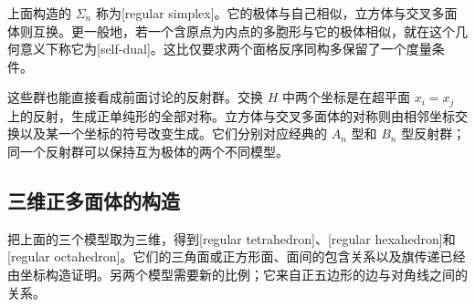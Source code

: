 上面构造的 \(\Sigma_n\) 称为[regular simplex]。它的极体与自己相似，立方体与交叉多面体则互换。更一般地，若一个含原点为内点的多胞形与它的极体相似，就在这个几何意义下称它为[self-dual]。这比仅要求两个面格反序同构多保留了一个度量条件。

\ProseParagraphBreak

这些群也能直接看成前面讨论的反射群。交换 \(H\) 中两个坐标是在超平面 \(x_i=x_j\) 上的反射，生成正单纯形的全部对称。立方体与交叉多面体的对称则由相邻坐标交换以及某一个坐标的符号改变生成。它们分别对应经典的 \(A_n\) 型和 \(B_n\) 型反射群；同一个反射群可以保持互为极体的两个不同模型。

\subsection{三维正多面体的构造}
\label{g1:subsec:E03:03}

把上面的三个模型取为三维，得到[regular tetrahedron]、[regular hexahedron]和[regular octahedron]。它们的三角面或正方形面、面间的包含关系以及旗传递已经由坐标构造证明。另两个模型需要新的比例；它来自正五边形的边与对角线之间的关系。

